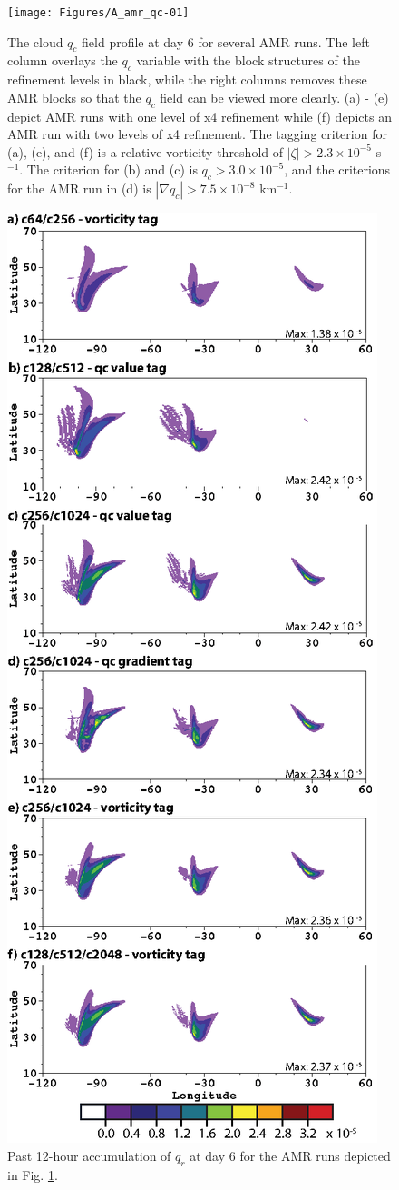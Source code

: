 \documentclass{ametsoc}
\begin{document}
\begin{figure}
   \centerline{%
   \noindent
   \texttt{[image: Figures/A\_amr\_qc-01]}}
   \caption{The cloud $q_c$ field profile at day 6 for several AMR runs.  The left column overlays
   the $q_c$ variable with the block structures of the refinement levels in black, while the right columns
   removes these AMR blocks so that the $q_c$ field can be viewed more clearly. 
  (a) - (e) depict AMR runs with one level of x4 refinement while (f) depicts an AMR run with two levels
  of x4 refinement. The tagging criterion for (a), (e), and (f) is a relative vorticity threshold of
  $|\zeta| > 2.3 \times 10^{-5}$ s$^{-1}$. The criterion for (b) and (c) is $q_c > 3.0\times 10^{-5}$,
  and the criterions for the AMR run in (d) is $|\nabla q_c | > 7.5\times 10^{-8}$ km$^{-1}$.
   }
   \label{fig:amrqc}
\end{figure}

 \begin{figure}
   \centerline{%
   \noindent
   \includegraphics[height=.75\textheight]{Figures/A_amr_qrdt_zoom-01}}
   \caption{Past 12-hour accumulation of $q_r$ at day 6 for the AMR runs depicted in Fig. \ref{fig:amrqc}.
   }
   \label{fig:amrqrdt}
\end{figure}
\end{document}

